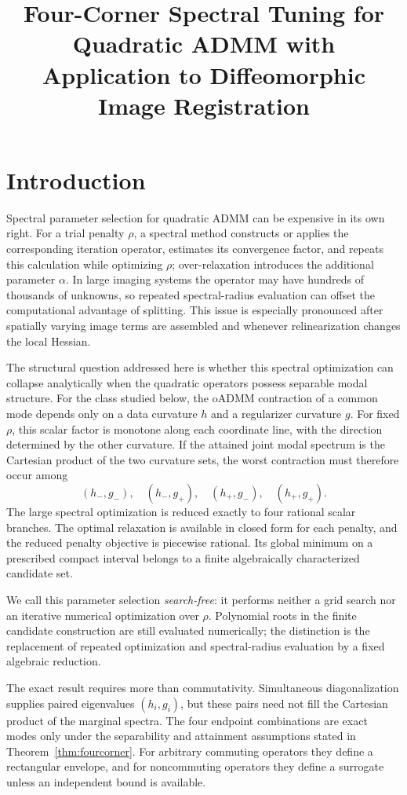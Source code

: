 \documentclass[pdflatex,iicol,sn-mathphys-num]{sn-jnl}
\title[Four-Corner Spectral Tuning]{Four-Corner Spectral Tuning for Quadratic ADMM with Application to Diffeomorphic Image Registration}
\author[1]{\fnm{Katherine} \sur{Xie}}
\author[1]{\fnm{Jie} \sur{Wu}}
\author*[1]{\fnm{Xiaohui} \sur{Xie}}\email{xhx@uci.edu}
\affil*[1]{\orgdiv{Department of Computer Science}, \orgname{University of California, Irvine}, \orgaddress{\city{Irvine}, \state{California}, \country{USA}}}
\theoremstyle{definition}
\begin{document}
\maketitle
\section{Introduction}\label{sec:introduction}
Spectral parameter selection for quadratic ADMM can be expensive in its own
right. For a trial penalty $\rho$, a spectral method constructs or applies the
corresponding iteration operator, estimates its convergence factor, and
repeats this calculation while optimizing $\rho$; over-relaxation introduces
the additional parameter $\alpha$. In large imaging systems the operator may
have hundreds of thousands of unknowns, so repeated spectral-radius evaluation
can offset the computational advantage of splitting. This issue is especially
pronounced after spatially varying image terms are assembled and whenever
relinearization changes the local Hessian.

The structural question addressed here is whether this spectral optimization
can collapse analytically when the quadratic operators possess separable modal
structure. For the class studied below, the oADMM contraction of a common mode
depends only on a data curvature $h$ and a regularizer curvature $g$. For fixed
$\rho$, this scalar factor is monotone along each coordinate line, with the
direction determined by the other curvature. If the
attained joint modal spectrum is the Cartesian product of the two curvature
sets, the worst contraction must therefore occur among
\[
(h_-,g_-),\quad(h_-,g_+),\quad(h_+,g_-),\quad(h_+,g_+).
\]
The large spectral optimization is reduced exactly to four rational scalar
branches. The optimal relaxation is available in closed form for each
penalty, and the reduced penalty objective is piecewise rational. Its global
minimum on a prescribed compact interval belongs to a finite algebraically
characterized candidate set.

We call this parameter selection \emph{search-free}: it performs neither a
grid search nor an iterative numerical optimization over $\rho$. Polynomial
roots in the finite candidate construction are still evaluated numerically;
the distinction is the replacement of repeated optimization and
spectral-radius evaluation by a fixed algebraic reduction.

The exact result requires more than commutativity. Simultaneous
diagonalization supplies paired eigenvalues $(h_i,g_i)$, but these pairs need
not fill the Cartesian product of the marginal spectra. The four endpoint
combinations are exact modes only under the separability and attainment
assumptions stated in Theorem~\ref{thm:fourcorner}. For arbitrary commuting
operators they define a rectangular envelope, and for noncommuting operators
they define a surrogate unless an independent bound is available.
\end{document}
